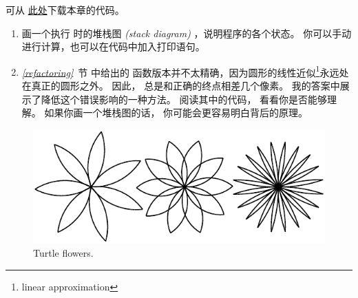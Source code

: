 \begin{exercise}


可从 \href{http://thinkpython2.com/code/polygon.py}{此处}下载本章的代码。


\begin{enumerate}

\item 画一个执行 {\em {}} 时的堆栈图 {\em (stack diagram) } ，说明程序的各个状态。 你可以手动进行计算，也可以在代码中加入打印语句。

\item {\em \ref{refactoring}}~节 中给出的 {\em {} } 函数版本并不太精确，因为圆形的线性近似\footnote{linear approximation}永远处在真正的圆形之外。  
因此，{\em {}} 总是和正确的终点相差几个像素。  
我的答案中展示了降低这个错误影响的一种方法。  
阅读其中的代码， 看看你是否能够理解。  
如果你画一个堆栈图的话， 你可能会更容易明白背后的原理。

\end{enumerate}

\end{exercise}


\begin{figure}
\centerline
{\includegraphics[scale=0.85]{../source/figs/flowers.pdf}}
\caption{Turtle flowers.}
\label{fig.flowers}
\end{figure}

